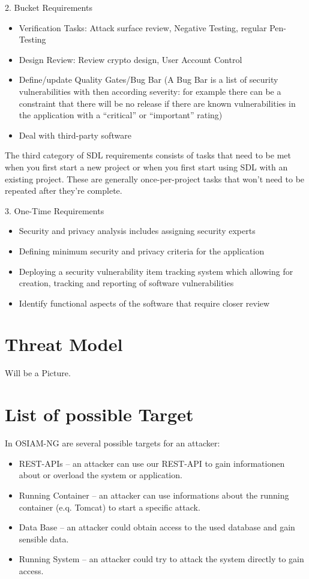 2. Bucket Requirements
\begin{itemize}
	\item Verification Tasks: Attack surface review, Negative Testing, regular Pen-Testing
	\item Design Review: Review crypto design, User Account Control
	\item Define/update Quality Gates/Bug Bar (A Bug Bar is a list of security vulnerabilities with then according severity: for example there can be a constraint that there will be no release if there are known vulnerabilities in the application with a ``critical'' or ``important'' rating)
	\item Deal with third-party software
\end{itemize}

The third category of SDL requirements consists of tasks that need to be met when you first start a new project or when you first start using SDL with an existing project. These are generally once-per-project tasks that won’t need to be repeated after they’re complete.

3. One-Time Requirements
\begin{itemize}
	\item Security and privacy analysis includes assigning security experts
	\item Defining minimum security and privacy criteria for the application
	\item Deploying a security vulnerability item tracking system which allowing for creation, tracking and reporting of software vulnerabilities
	\item Identify functional aspects of the software that require closer review
\end{itemize}


\section{Threat Model}
Will be a Picture.

\section{List of possible Target}
In OSIAM-NG are several possible targets for an attacker:
\begin{itemize}
\item REST-APIs -- an attacker can use our REST-API to gain informationen about or overload the system or application.
\item Running Container -- an attacker can use informations about the running container (e.q. Tomcat) to start a specific attack.
\item Data Base -- an attacker could obtain access to the used database and gain sensible data.
\item Running System -- an attacker could try to attack the system directly to gain access.
\end{itemize}

